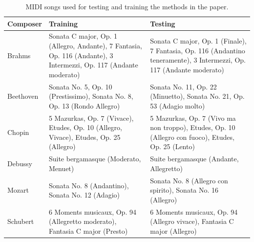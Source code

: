 \documentclass[5p]{elsarticle}
\begin{document}
\begin{center}
\begin{table}[ht]
\caption{MIDI songs used for testing and training the methods in the paper.}
\begin{center}
\begin{tabular}{L{2cm} L{4cm} L{4cm}}
Composer & Training & Testing \\ \hline
Brahms & 
Sonata C major, Op. 1 (Allegro, Andante), 7 Fantasia, Op. 116 (Andante), 3 Intermezzi, Op. 117 (Andante moderato)
& 
Sonata C major, Op. 1 (Finale), 7 Fantasia, Op. 116 (Andantino teneramente), 3 Intermezzi, Op. 117 (Andante moderato)
\\

Beethoven & Sonata No. 5, Op. 10 (Prestissimo), Sonata No. 8, Op. 13 (Rondo Allegro) & Sonata No. 11, Op. 22 (Minuetto), Sonata No. 21, Op. 53 (Adagio molto) \\

Chopin & 5 Mazurkas, Op. 7 (Vivace), Etudes, Op. 10 (Allegro, Vivace), Etudes, Op. 25 (Allegro) 
& 5 Mazurkas, Op. 7 (Vivo ma non troppo), Etudes, Op. 10 (Allegro con fuoco), Etudes, Op. 25 (Lento)
\\
Debussy & Suite bergamasque (Moderato, Menuet) & Suite bergamasque (Andante, Allegretto) \\
Mozart & Sonata No. 8 (Andantino), Sonata No. 12 (Adagio)
 & Sonata No. 8 (Allegro con spirito), Sonata No. 16 (Allegro)  \\

Schubert & 
6 Moments musicaux, Op. 94 (Allegretto moderato), Fantasia C major (Presto)
& 6 Moments musicaux, Op. 94 (Allegro vivace), Fantasia C major (Allegro)
\\

\end{tabular}
\end{center}
\end{table}
\end{center}



\end{document}
